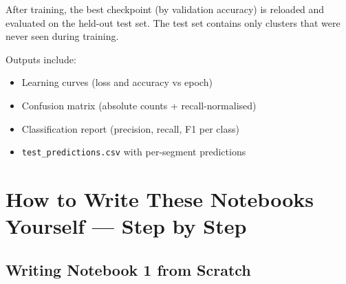\documentclass[12pt,a4paper]{article}
\begin{document}
After training, the best checkpoint (by validation accuracy) is reloaded and evaluated on the held-out test set. The test set contains only clusters that were never seen during training.

Outputs include:
\begin{itemize}[nosep]
  \item Learning curves (loss and accuracy vs epoch)
  \item Confusion matrix (absolute counts + recall-normalised)
  \item Classification report (precision, recall, F1 per class)
  \item \texttt{test\_predictions.csv} with per-segment predictions
\end{itemize}


\section{How to Write These Notebooks Yourself --- Step by Step}

\subsection{Writing Notebook 1 from Scratch}
\end{document}
